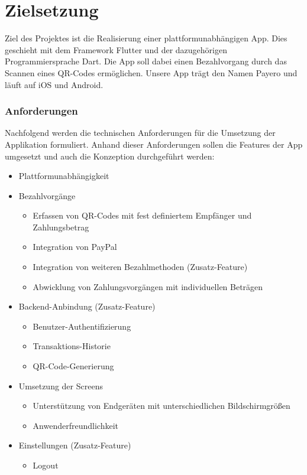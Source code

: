 
\chapter{Zielsetzung}

Ziel des Projektes ist die Realisierung einer plattformunabhängigen App.
Dies geschieht mit dem Framework Flutter und der dazugehörigen Programmiersprache Dart.
Die App soll dabei einen Bezahlvorgang durch das Scannen eines QR-Codes ermöglichen.
Unsere App trägt den Namen \glqq Payero\grqq{} und läuft auf iOS und Android.

\subsection{Anforderungen}

Nachfolgend werden die technischen Anforderungen für die Umsetzung der Applikation formuliert. Anhand dieser Anforderungen sollen die Features der App umgesetzt und auch die Konzeption durchgeführt werden:

\begin{itemize}
    \item Plattformunabhängigkeit
    \item Bezahlvorgänge
    \begin{itemize}
        \item Erfassen von QR-Codes mit fest definiertem Empfänger und Zahlungsbetrag
        \item Integration von PayPal
        \item Integration von weiteren Bezahlmethoden (Zusatz-Feature)
        \item Abwicklung von Zahlungsvorgängen mit individuellen Beträgen
    \end{itemize}
    \item Backend-Anbindung (Zusatz-Feature)
    \begin{itemize}
        \item Benutzer-Authentifizierung
        \item Transaktions-Historie
        \item QR-Code-Generierung
    \end{itemize}
    \item Umsetzung der Screens
    \begin{itemize}
            \item Unterstützung von Endgeräten mit unterschiedlichen Bildschirmgrößen
            \item Anwenderfreundlichkeit
    \end{itemize}
    \item Einstellungen (Zusatz-Feature)
    \begin{itemize}
        \item Logout
    \end{itemize}
\end{itemize}

